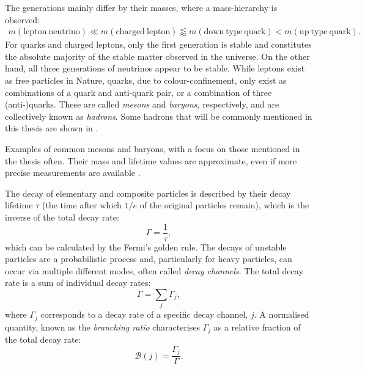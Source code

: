 The generations mainly differ by their masses, where a mass-hierarchy is observed: 
\begin{align*}
    m(\mathrm{lepton~neutrino})\ll m(\mathrm{charged~lepton})\lessapprox m(\mathrm{down~type~quark})<m(\mathrm{up~type~quark}).
\end{align*}
For quarks and charged leptons, only the first generation is stable and constitutes the absolute majority of the stable matter observed in the universe.
On the other hand, all three generations of neutrinos appear to be stable.
While leptons exist as free particles in Nature, quarks, due to colour-confinement, 
only exist as combinations of a quark and anti-quark pair, or a combination of three (anti-)quarks.
These are called \textit{mesons} and \textit{baryons}, respectively, and are collectively known as \textit{hadrons}.
Some hadrons that will be commonly mentioned in this thesis are shown in .
\begin{table}[htbp!]
    \centering
    \caption{\label{tab:hadrons}
    Examples of common mesons and baryons, with a focus on those mentioned in the thesis often.
    Their mass and lifetime values are approximate, even if more precise measurements are available \cite{Workman:2022ynf}.
    }
    
\end{table}

The decay of elementary and composite particles is described by their decay lifetime $\tau$ (the time after which $1/e$ of the original particles remain), 
which is the inverse of the total decay rate:
\begin{equation}
    \Gamma = \frac{1}{\tau},
\end{equation}
which can be calculated by the Fermi's golden rule.
The decays of unstable particles are a probabilistic process and, particularly for heavy particles, can occur via multiple different modes, often called \textit{decay channels}.
The total decay rate is a sum of individual decay rates:
\begin{equation}
    \Gamma = \sum_j\Gamma_j,
\end{equation}
where $\Gamma_j$ corresponds to a decay rate of a specific decay channel, $j$.
A normalised quantity, known as the \textit{branching ratio} characterises $\Gamma_j$ as a relative fraction of the total decay rate:
\begin{equation}\label{eq:branching_fraction_definition}
    \mathcal{B}(j) = \frac{\Gamma_j}{\Gamma}.
\end{equation}

